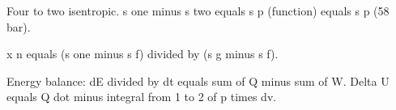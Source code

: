 Four to two isentropic.  
s one minus s two equals s p (function) equals s p (58 bar).  

x n equals (s one minus s f) divided by (s g minus s f).

Energy balance:  
dE divided by dt equals sum of Q minus sum of W.  
Delta U equals Q dot minus integral from 1 to 2 of p times dv.